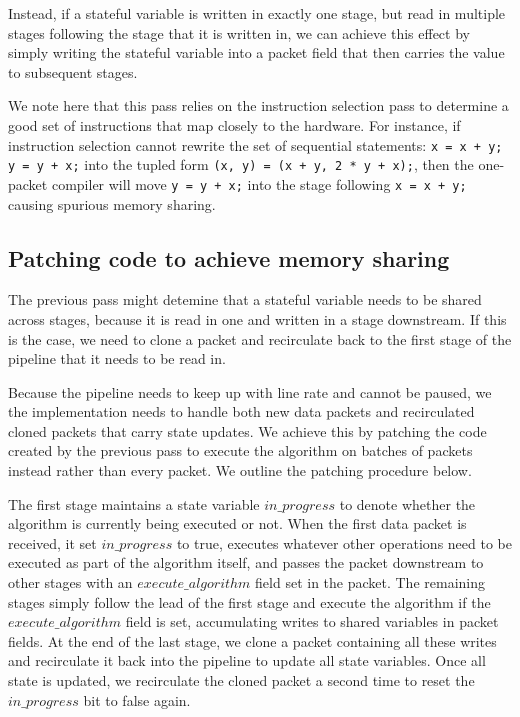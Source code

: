 Instead, if a stateful variable is written in exactly one stage, but read in
multiple stages following the stage that it is written in, we can achieve this
effect by simply writing the stateful variable into a packet field that then
carries the value to subsequent stages.

We note here that this pass relies on the instruction selection pass to
determine a good set of instructions that map closely to the hardware. For
instance, if instruction selection cannot rewrite the set of sequential
statements: \texttt{x = x + y; y = y + x;} into the tupled form \texttt{(x, y)
= (x + y, 2 * y + x);}, then the one-packet compiler will move \texttt{y = y +
x;} into the stage following \texttt{x = x + y;} causing spurious memory
sharing.

\subsection{Patching code to achieve memory sharing}
The previous pass might detemine that a stateful variable needs to be shared
across stages, because it is read in one and written in a stage downstream. If
this is the case, we need to clone a packet and recirculate back to the first
stage of the pipeline that it needs to be read in.

Because the pipeline needs to keep up with line rate and cannot be paused, we
the implementation needs to handle both new data packets and recirculated
cloned packets that carry state updates. We achieve this by patching the code
created by the previous pass to execute the algorithm on batches of packets
instead rather than every packet. We outline the patching procedure below.

The first stage maintains a state variable $in\_progress$ to denote whether the
algorithm is currently being executed or not. When the first data packet is
received, it set $in\_progress$ to true, executes whatever other operations
need to be executed as part of the algorithm itself, and passes the packet
downstream to other stages with an $execute\_algorithm$ field set in the
packet. The remaining stages simply follow the lead of the first stage and
execute the algorithm if the $execute\_algorithm$ field is set, accumulating
writes to shared variables in packet fields. At the end of the last stage, we
clone a packet containing all these writes and recirculate it back into the
pipeline to update all state variables. Once all state is updated, we
recirculate the cloned packet a second time to reset the $in\_progress$ bit to
false again.

